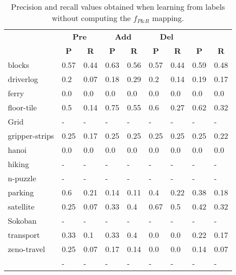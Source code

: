 \documentclass{article}
\begin{document}
\begin{table}
	\begin{center}
		\begin{scriptsize}
			\begin{tabular}{l|l|l|l|l|l|l||l|l|}
				& \multicolumn{2}{|c|}{\bf Pre} & \multicolumn{2}{|c|}{\bf Add} & \multicolumn{2}{|c||}{\bf Del} & \multicolumn{2}{|c}{\bf}\\ \cline{2-9}			
				& \multicolumn{1}{|c|}{\bf P} & \multicolumn{1}{|c|}{\bf R} & \multicolumn{1}{|c|}{\bf P} & \multicolumn{1}{|c|}{\bf R} & \multicolumn{1}{|c|}{\bf P} & \multicolumn{1}{|c||}{\bf R} &  \multicolumn{1}{|c|}{\bf P} & \multicolumn{1}{|c|}{\bf R} \\
				\hline
				blocks & 0.57 & 0.44 & 0.63 & 0.56 & 0.57 & 0.44 & 0.59 & 0.48 \\
				driverlog & 0.2 & 0.07 & 0.18 & 0.29 & 0.2 & 0.14 & 0.19 & 0.17 \\
				ferry & 0.0 & 0.0 & 0.0 & 0.0 & 0.0 & 0.0 & 0.0 & 0.0 \\
				floor-tile & 0.5 & 0.14 & 0.75 & 0.55 & 0.6 & 0.27 & 0.62 & 0.32 \\
				Grid & - & - & - & - & - & - & - & - \\ %
				gripper-strips & 0.25 & 0.17 & 0.25 & 0.25 & 0.25 & 0.25 & 0.25 & 0.22 \\
				hanoi & 0.0 & 0.0 & 0.0 & 0.0 & 0.0 & 0.0 & 0.0 & 0.0 \\
				hiking & - & - & - & - & - & - & - & - \\ %
				n-puzzle & - & - & - & - & - & - & - & - \\ %
				parking & 0.6 & 0.21 & 0.14 & 0.11 & 0.4 & 0.22 & 0.38 & 0.18 \\
				satellite & 0.25 & 0.07 & 0.33 & 0.4 & 0.67 & 0.5 & 0.42 & 0.32 \\
				Sokoban & - & - & - & - & - & - & - & - \\ %
				transport & 0.33 & 0.1 & 0.33 & 0.4 & 0.0 & 0.0 & 0.22 & 0.17 \\
				zeno-travel & 0.25 & 0.07 & 0.17 & 0.14 & 0.0 & 0.0 & 0.14 & 0.07 \\
				\hline
				\bf  & - & - & - & - & - & - & - & - \\
			\end{tabular}
		\end{scriptsize}
	\end{center}
	\caption{\small Precision and recall values obtained when learning from labels without computing the $f_{P\&R}$ mapping.}
	\label{fig:labelsnomap}
	

\end{table}
\end{document}

